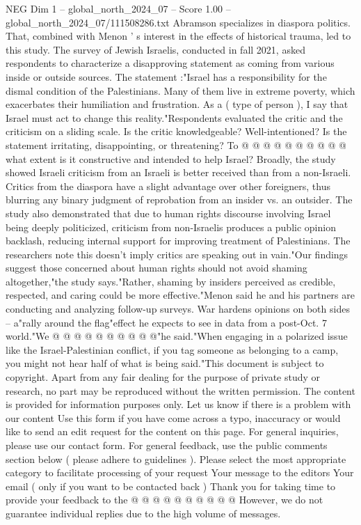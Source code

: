 \begin{textsample}{NEG Dim 1 – global\_north\_2024\_07 – Score 1.00 – global\_north\_2024\_07/111508286.txt}
Abramson specializes in diaspora politics.
That, combined with Menon ' s interest in the effects of historical trauma, led to this study.
The survey of Jewish Israelis, conducted in fall 2021, asked respondents to characterize a disapproving statement as coming from various inside or outside sources.
The statement :"Israel has a responsibility for the dismal condition of the Palestinians.
Many of them live in extreme poverty, which exacerbates their humiliation and frustration.
As a ( type of person ), I say that Israel must act to change this reality."Respondents evaluated the critic and the criticism on a sliding scale.
Is the critic knowledgeable?
Well-intentioned?
Is the statement irritating, disappointing, or threatening?
To @ @ @ @ @ @ @ @ @ @ what extent is it constructive and intended to help Israel?
Broadly, the study showed Israeli criticism from an Israeli is better received than from a non-Israeli.
Critics from the diaspora have a slight advantage over other foreigners, thus blurring any binary judgment of reprobation from an insider vs. an outsider.
The study also demonstrated that due to human rights discourse involving Israel being deeply politicized, criticism from non-Israelis produces a public opinion backlash, reducing internal support for improving treatment of Palestinians.
The researchers note this doesn't imply critics are speaking out in vain."Our findings suggest those concerned about human rights should not avoid shaming altogether,"the study says."Rather, shaming by insiders perceived as credible, respected, and caring could be more effective."Menon said he and his partners are conducting and analyzing follow-up surveys.
War hardens opinions on both sides -- a"rally around the flag"effect he expects to see in data from a post-Oct. 7 world."We @ @ @ @ @ @ @ @ @ @"he said."When engaging in a polarized issue like the Israel-Palestinian conflict, if you tag someone as belonging to a camp, you might not hear half of what is being said."This document is subject to copyright.
Apart from any fair dealing for the purpose of private study or research, no part may be reproduced without the written permission.
The content is provided for information purposes only.
Let us know if there is a problem with our content Use this form if you have come across a typo, inaccuracy or would like to send an edit request for the content on this page.
For general inquiries, please use our contact form.
For general feedback, use the public comments section below ( please adhere to guidelines ).
Please select the most appropriate category to facilitate processing of your request Your message to the editors Your email ( only if you want to be contacted back ) Thank you for taking time to provide your feedback to the @ @ @ @ @ @ @ @ @ @ However, we do not guarantee individual replies due to the high volume of messages.

\end{textsample}
